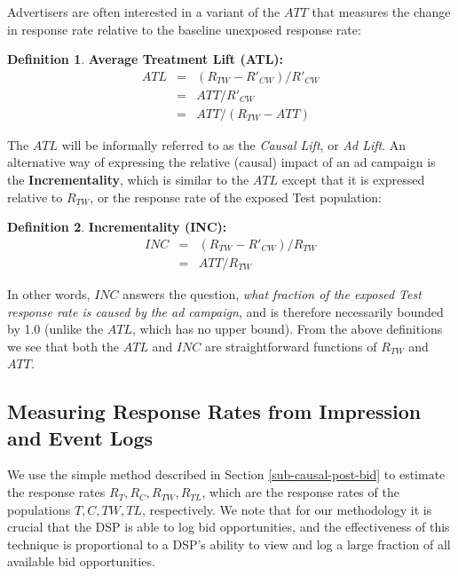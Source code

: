 \documentclass[11pt,a4paper]{article}
\theoremstyle{definition}
\newtheorem{definition}{Definition}[section]
\theoremstyle{remark}
\theoremstyle{definition}
\theoremstyle{definition}
\theoremstyle{definition}
\theoremstyle{definition}
\theoremstyle{definition}
\theoremstyle{definition}
\begin{document}
Advertisers are often interested in a variant of the $ATT$ that measures the change in response rate relative to the baseline unexposed response rate:

\begin{definition}\label{def-lift}
	\textbf{Average Treatment Lift (ATL):} 
\begin{eqnarray}
ATL &= & (R_{TW} - R'_{CW})/R'_{CW}\\
    &= & ATT/R'_{CW}\\
    &= & ATT/(R_{TW} - ATT) \label{eq-atl}	
\end{eqnarray}
\end{definition}

The $ATL$ will be informally referred to as the \textit{Causal Lift}, or \textit{Ad Lift}. An alternative way of expressing the relative (causal) impact of an ad campaign is the \textbf{Incrementality}, which is similar to the $ATL$ except that it is expressed relative to $R_{TW}$, or the response rate of the exposed Test population:

\begin{definition}\label{def-inc}
	\textbf{Incrementality (INC):} 
\begin{eqnarray}
INC &= & (R_{TW} - R'_{CW})/R_{TW}\\
    &= & ATT/R_{TW} 	\label{eq-inc}	
\end{eqnarray}
\end{definition}

In other words, $INC$ answers the question, \textit{what fraction of the exposed Test response rate is caused by the ad campaign}, and is therefore necessarily bounded by 1.0 (unlike the $ATL$, which has no upper bound). From the above definitions we see that both the $ATL$ and $INC$ are straightforward functions of $R_{TW}$ and $ATT$.


\subsection{Measuring Response Rates from Impression and Event Logs}
We use the simple method described in Section \ref{sub-causal-post-bid} to estimate the response rates   
$R_T, R_C, R_{TW}, R_{TL}$, which are the response rates of the populations $T,C,TW,TL$, respectively. 
We note that for our methodology it is crucial that the DSP is able to log bid opportunities, and the effectiveness of this technique is proportional to a DSP's ability to view and log a large fraction of all available bid opportunities.
 
\end{document}
